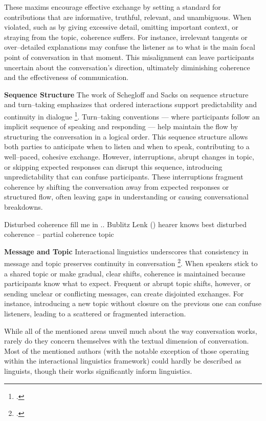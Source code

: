 \documentclass[12pt]{report}
\begin{document}
{These maxims encourage effective exchange by setting a standard for contributions that are informative, truthful, relevant, and unambiguous. When violated, such as by giving excessive detail, omitting important context, or straying from the topic, coherence suffers. For instance, irrelevant tangents or over–detailed explanations may confuse the listener as to what is the main focal point of conversation in that moment. This misalignment can leave participants uncertain about the conversation’s direction, ultimately diminishing coherence and the effectiveness of communication.

\par{\textbf{Sequence Structure}}
The work of Schegloff and Sacks on sequence structure and turn–taking emphasizes that ordered interactions support predictability and continuity in dialogue \footcite{Schegloff_2007}. Turn–taking conventions — where participants follow an implicit sequence of speaking and responding — help maintain the flow by structuring the conversation in a logical order. This sequence structure allows both parties to anticipate when to listen and when to speak, contributing to a well–paced, cohesive exchange. However, interruptions, abrupt changes in topic, or skipping expected responses can disrupt this sequence, introducing unpredictability that can confuse participants. These interruptions fragment coherence by shifting the conversation away from expected responses or structured flow, often leaving gaps in understanding or causing conversational breakdowns.

Disturbed coherence fill me in .. Bublitz Lenk ()
hearer knows best
disturbed coherence – partial coherence
topic

\par{\textbf{Message and Topic}}
Interactional linguistics underscores that consistency in message and topic preserves continuity in conversation
\footcite{CouperKuhlenSelting2017}.
When speakers stick to a shared topic or make gradual, clear shifts, coherence is
maintained because participants know what to expect.
Frequent or abrupt topic shifts, however, or sending unclear or conflicting messages, can create disjointed exchanges.
For instance, introducing a new topic without closure on the previous one can confuse listeners,
leading to a scattered or fragmented interaction.

\par
While all of the mentioned areas unveil much about the way conversation works,
rarely do they concern themselves with the textual dimension of conversation.
Most of the mentioned authors (with the notable exception of those operating within the interactional linguistics framework) could hardly be described as linguists,
though their works significantly inform linguistics.

}
\end{document}
